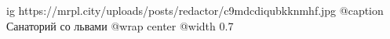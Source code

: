  
 
 
 
 

\ifcmt
  ig https://mrpl.city/uploads/posts/redactor/c9mdcdiqubkknmhf.jpg
	@caption Санаторий со львами
  @wrap center
  @width 0.7
\fi
